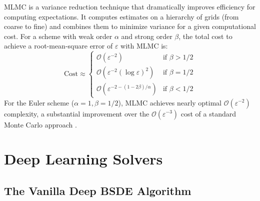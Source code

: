 \begin{theorem}
\label{thm:mlmc}
MLMC is a variance reduction technique that dramatically improves efficiency for computing expectations. It computes estimates on a hierarchy of grids (from coarse to fine) and combines them to minimize variance for a given computational cost. For a scheme with weak order \(\alpha\) and strong order \(\beta\), the total cost to achieve a root-mean-square error of \(\varepsilon\) with MLMC is:
\[
\text{Cost} \approx \begin{cases} \mathcal{O}(\varepsilon^{-2}) & \text{if } \beta > 1/2 \\ \mathcal{O}(\varepsilon^{-2}(\log\varepsilon)^2) & \text{if } \beta = 1/2 \\ \mathcal{O}(\varepsilon^{-2-(1-2\beta)/\alpha}) & \text{if } \beta < 1/2 \end{cases}
\]
For the Euler scheme (\(\alpha=1, \beta=1/2\)), MLMC achieves nearly optimal \(\mathcal{O}(\varepsilon^{-2})\) complexity, a substantial improvement over the \(\mathcal{O}(\varepsilon^{-3})\) cost of a standard Monte Carlo approach \cite{Giles2008}.
\end{theorem}

\section{Deep Learning Solvers}
\label{sec:deep_solvers}

\subsection{The Vanilla Deep BSDE Algorithm}
\label{sec:deep_vanilla}

